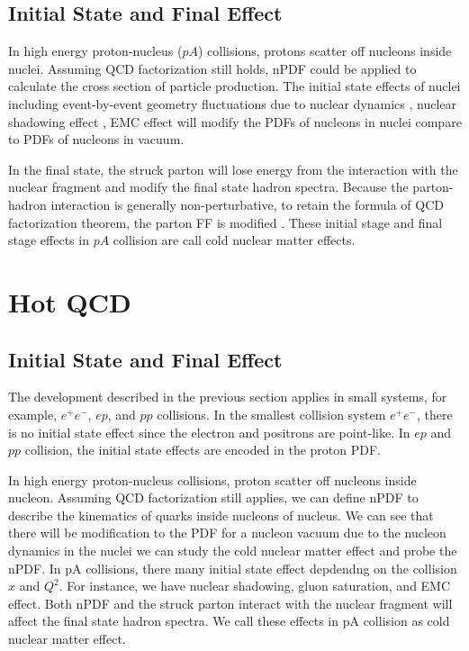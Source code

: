 \subsection{Initial State and Final Effect}

In high energy proton-nucleus ($pA$) collisions, protons scatter off nucleons inside nuclei. Assuming QCD factorization still holds, nPDF could be applied to calculate the cross section of particle production. The initial state effects of nuclei including event-by-event geometry fluctuations due to nuclear dynamics \cite{GuntherV3}, nuclear shadowing effect \cite{IntroShadow}, EMC effect \cite{EMC} will modify the PDFs of nucleons in nuclei compare to PDFs of nucleons in vacuum. 

In the final state, the struck parton will lose energy from the interaction with the nuclear fragment and modify the final state hadron spectra. Because the parton-hadron interaction is generally non-perturbative, to retain the formula of QCD factorization theorem, the parton FF is modified \cite{CNEEFF}. These initial stage and final stage effects in $pA$ collision are call cold nuclear matter effects. 

\section{Hot QCD}

\iffalse 

\subsection{Initial State and Final Effect}


The development described in the previous section applies in small systems, for example, $e^+ e^-$, $ep$, and $pp$ collisions. In the smallest collision system $e^+e^-$, there is no initial state effect since the electron and positrons are point-like. In $ep$ and $pp$ collision, the initial state effects are encoded in the proton PDF. 

In high energy proton-nucleus collisions, proton scatter off nucleons inside nucleon. Assuming QCD factorization still applies, we can define nPDF to describe the kinematics of quarks inside nucleons of nucleus. We can see that there will be modification to the PDF for a nucleon vacuum due to the nucleon dynamics in the nuclei we can study the cold nuclear matter effect and probe the nPDF. In pA collisions, there many initial state effect depdendng on the collision $x$ and $Q^2$. For instance, we have nuclear shadowing, gluon saturation, and EMC effect. Both nPDF and the struck parton interact with the nuclear fragment will affect the final state hadron spectra. We call these effects in pA collision as cold nuclear matter effect.

